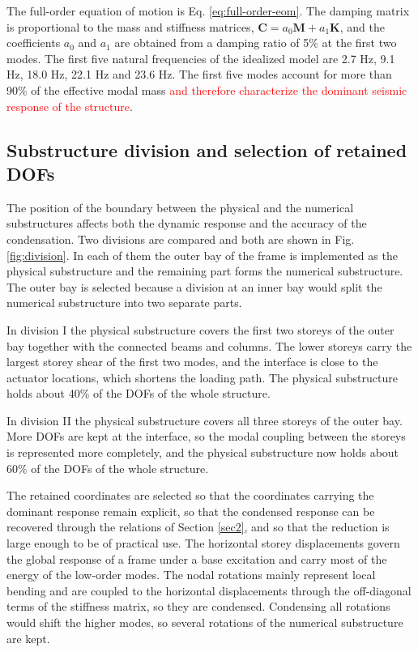 \documentclass[11pt,a4paper]{article}
\numberwithin{equation}{section}
\newcommand{\rev}[1]{\textcolor{red}{#1}}
\begin{document}
The full-order equation of motion is Eq. \eqref{eq:full-order-eom}. The damping matrix is proportional to the mass and stiffness matrices, \(\mathbf{C}=a_{0}\mathbf{M}+a_{1}\mathbf{K}\), and the coefficients \(a_{0}\) and \(a_{1}\) are obtained from a damping ratio of 5\% at the first two modes. The first five natural frequencies of the idealized model are 2.7 Hz, 9.1 Hz, 18.0 Hz, 22.1 Hz and 23.6 Hz. The first five modes account for more than 90\% of the effective modal mass \rev{and therefore characterize the dominant seismic response of the structure}.

\subsection{Substructure division and selection of retained DOFs}
\label{sec:division}

The position of the boundary between the physical and the numerical substructures affects both the dynamic response and the accuracy of the condensation. Two divisions are compared and both are shown in Fig. \ref{fig:division}. In each of them the outer bay of the frame is implemented as the physical substructure and the remaining part forms the numerical substructure. The outer bay is selected because a division at an inner bay would split the numerical substructure into two separate parts.

In division I the physical substructure covers the first two storeys of the outer bay together with the connected beams and columns. The lower storeys carry the largest storey shear of the first two modes, and the interface is close to the actuator locations, which shortens the loading path. The physical substructure holds about 40\% of the DOFs of the whole structure.

In division II the physical substructure covers all three storeys of the outer bay. More DOFs are kept at the interface, so the modal coupling between the storeys is represented more completely, and the physical substructure now holds about 60\% of the DOFs of the whole structure.

The retained coordinates are selected so that the coordinates carrying the dominant response remain explicit, so that the condensed response can be recovered through the relations of Section \ref{sec2}, and so that the reduction is large enough to be of practical use. The horizontal storey displacements govern the global response of a frame under a base excitation and carry most of the energy of the low-order modes. The nodal rotations mainly represent local bending and are coupled to the horizontal displacements through the off-diagonal terms of the stiffness matrix, so they are condensed. Condensing all rotations would shift the higher modes, so several rotations of the numerical substructure are kept.
\end{document}
